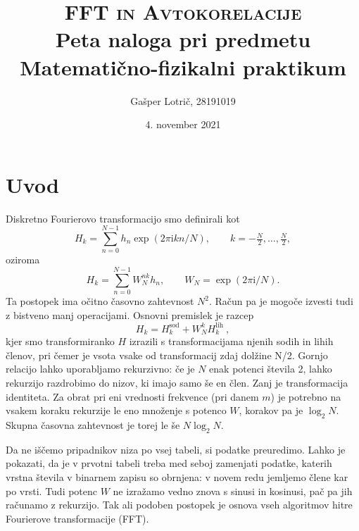 \documentclass[a4paper, 12pt, slovene]{article}
\newcommand{\ii}{\mathrm{i}}
\begin{document}
\begin{titlepage}
\title{\textsc{FFT in Avtokorelacije} \\[1ex] \large Peta naloga pri predmetu Matematično-fizikalni praktikum}
\author{Gašper Lotrič, 28191019}
\date{4. november 2021}

\maketitle
\end{titlepage}

\tableofcontents
\pagebreak


\section{Uvod}
Diskretno Fourierovo transformacijo smo definirali kot
\begin{equation*}
H_k = \sum_{n=0}^{N-1}
h_n \exp(2 \pi \ii k n / N),
\qquad k=-\tfrac{N}{2},\dots ,\tfrac{N}{2},
\end{equation*}
oziroma
\begin{equation*}
H_k = \sum_{n=0}^{N-1} W_N^{nk} h_n,
\qquad W_N = \exp(2 \pi \ii / N).
\end{equation*}
Ta postopek ima očitno časovno zahtevnost $N^2$. Račun pa je
mogoče izvesti tudi z bistveno manj operacijami. Osnovni premislek
je razcep
\begin{equation*}
H_k = H_{k}^\mathrm{sod} + W_N^k H_{k}^\mathrm{lih} \>,  
\end{equation*}
kjer smo transformiranko $H$ izrazili s transformacijama njenih
sodih in lihih členov, pri čemer je vsota vsake od transformacij zdaj dolžine N/2.
 Gornjo relacijo lahko uporabljamo rekurzivno:
če je $N$ enak potenci števila 2, lahko rekurzijo razdrobimo
do nizov, ki imajo samo še en člen. Zanj je transformacija
identiteta. Za obrat pri eni vrednosti frekvence (pri danem $m$)
je potrebno na vsakem koraku rekurzije le eno množenje s potenco
$W$, korakov pa je $\log_2 N$.  Skupna časovna zahtevnost je torej
le še $N\log_2 N$.

Da ne iščemo pripadnikov niza po vsej tabeli, si podatke
preuredimo. Lahko je pokazati, da je v prvotni tabeli treba med
seboj zamenjati podatke, katerih vrstna števila v binarnem zapisu
so obrnjena: v novem redu jemljemo člene kar po vrsti. Tudi
potenc $W$ ne izražamo vedno znova s sinusi in kosinusi,
pač pa jih računamo z rekurzijo.  Tak ali podoben postopek
je osnova vseh algoritmov hitre Fourierove transformacije (FFT).
\end{document}
